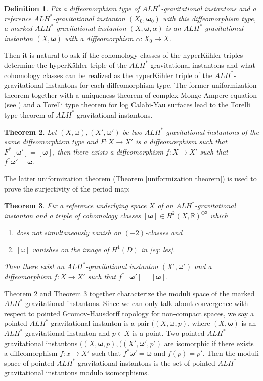 \documentclass[11pt]{amsart}
\theoremstyle{plain}
\newtheorem{thm}{Theorem}[section]
\newtheorem{defn}[thm]{Definition}
\theoremstyle{definition}
\numberwithin{equation}{section}
\begin{document}
  \begin{defn} \label{def: marked ALH*} 
  	 Fix a diffeomorphism type of $ALH^*$-gravitational instantons and a reference $ALH^*$-gravitational instanton $(X_0,\boldsymbol{\omega}_0)$ with this diffeomorphism type, a marked $ALH^*$-gravitational instanton $(X,\boldsymbol{\omega},\alpha)$ is an $ALH^*$-gravitational instanton $(X,\boldsymbol{\omega})$ with a diffeomorphism $\alpha: X_0\rightarrow X$. 
  \end{defn}
    Then it is natural to ask if the cohomology classes of the hyperK\"ahler triples determine the hyperK\"ahler triple of the $ALH^*$-gravitational instantons and what cohomology classes can be realized as the hyperK\"ahler triple of the $ALH^*$-gravitational instantons for each diffeomorphism type.
   The former uniformization theorem together with a uniqueness theorem of complex Monge-Ampere equation (see \cite[Proposition 4.6]{CJL2}) and a Torelli type theorem for log Calabi-Yau surfaces \cite{GHK} lead to the Torelli type theorem of $ALH^*$-gravitational instantons. 
   \begin{thm}\cite{CJL3}\label{torelli}
   	  Let $(X,\boldsymbol{\omega}), (X',\boldsymbol{\omega}')$ be two $ALH^*$-gravitational instantons of the same diffeomorphism type and $F:X\rightarrow X'$ is a diffeomorphism such that $F^*[\boldsymbol{\omega}']=[\boldsymbol{\omega}]$, then there exists a diffeomorphism $f:X\rightarrow X'$ such that $f^*\boldsymbol{\omega}'=\boldsymbol{\omega}$. 
   	\end{thm} 
   The latter uniformization theorem (Theorem \ref{uniformization theorem}) is used to prove the surjectivity of the period map:
   \begin{thm}\label{surj period}\cite{LL}
   	   Fix a reference underlying space $X$ of an $ALH^*$-gravitational instanton and a triple of cohomology classes $[\boldsymbol{\omega}]\in H^2(X,\mathbb{R})^{\oplus 3}$ which
   	   \begin{enumerate}
   	   	\item does not simultaneously vanish on $(-2)$-classes and 
   	   	\item $[\omega]$ vanishes on the image of $H^1(D)$ in \eqref{eq: les}.
   	   \end{enumerate}
   	    Then there exist an $ALH^*$-gravitational instanton $(X',\boldsymbol{\omega'})$ and a diffeomorphism $f:X\rightarrow X'$ such that $f^*[\boldsymbol{\omega}']=[\boldsymbol{\omega}]$. 
   \end{thm}
  Theorem \ref{torelli} and Theorem \ref{surj period} together characterize the moduli space of the marked $ALH^*$-gravitational instantons. Since we can only talk about convergence with respect to pointed Gromov-Hausdorff topology for non-compact spaces, we say a pointed $ALH^*$-gravitational instanton is a pair $((X,\boldsymbol{\omega},p)$, where $(X,\boldsymbol{\omega})$ is an $ALH^*$-gravitational instanton and $p\in X$ is a point. Two pointed $ALH^*$-gravitational instantons $((X,\boldsymbol{\omega},p),((X',\boldsymbol{\omega}',p')$ are isomorphic if there exists a diffeomorphism $f:x\rightarrow X'$ such that $f^*\boldsymbol{\omega}'=\boldsymbol{\omega}$ and $f(p)=p'$. Then the moduli space of pointed $ALH^*$-gravitational instantons is the set of pointed $ALH^*$-gravitational instantons modulo isomorphisms.   
\end{document}
